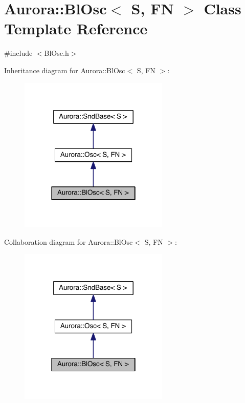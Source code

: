 \hypertarget{class_aurora_1_1_bl_osc}{}\section{Aurora\+:\+:Bl\+Osc$<$ S, FN $>$ Class Template Reference}
\label{class_aurora_1_1_bl_osc}


{\ttfamily \#include $<$Bl\+Osc.\+h$>$}



Inheritance diagram for Aurora\+:\+:Bl\+Osc$<$ S, FN $>$\+:\nopagebreak
\begin{figure}[H]
\begin{center}
\leavevmode
\includegraphics[width=202pt]{class_aurora_1_1_bl_osc__inherit__graph}
\end{center}
\end{figure}


Collaboration diagram for Aurora\+:\+:Bl\+Osc$<$ S, FN $>$\+:\nopagebreak
\begin{figure}[H]
\begin{center}
\leavevmode
\includegraphics[width=202pt]{class_aurora_1_1_bl_osc__coll__graph}
\end{center}
\end{figure}
